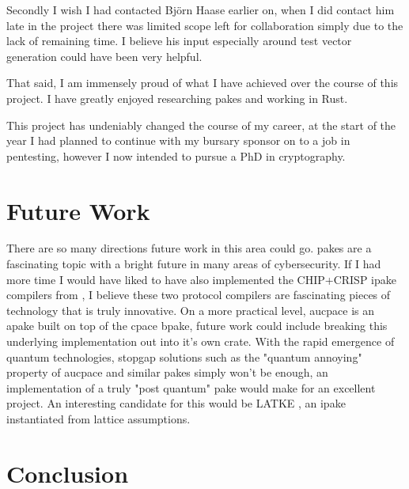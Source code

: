 Secondly I wish I had contacted Bj\"orn Haase earlier on, when I did contact him late in the project there was limited scope left for collaboration simply due to the lack of remaining time.
I believe his input especially around test vector generation could have been very helpful.

That said, I am immensely proud of what I have achieved over the course of this project.
I have greatly enjoyed researching \glspl{pake} and working in Rust.

This project has undeniably changed the course of my career, at the start of the year I had planned to continue with my bursary sponsor on to a job in pentesting, however I now intended to pursue a PhD in cryptography.

\section{Future Work}
There are so many directions future work in this area could go.
\glspl{pake} are a fascinating topic with a bright future in many areas of cybersecurity.
If I had more time I would have liked to have also implemented the CHIP+CRISP \gls{ipake} compilers from \citeauthor{chip+crisp}, I believe these two protocol compilers are fascinating pieces of technology that is truly innovative.
On a more practical level, \gls{aucpace} is an \gls{apake} built on top of the \gls{cpace} \gls{bpake}, future work could include breaking this underlying implementation out into it's own crate.
With the rapid emergence of quantum technologies, stopgap solutions such as the "quantum annoying" property of \gls{aucpace} and similar \glspl{pake} simply won't be enough, an implementation of a truly "post quantum" \gls{pake} would make for an excellent project.
An interesting candidate for this would be LATKE \cite{latke}, an \gls{ipake} instantiated from lattice assumptions.

\section{Conclusion}


